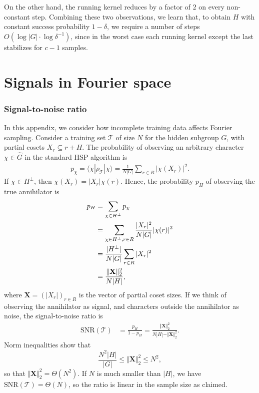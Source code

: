 \documentclass[aps, pre,reprint,nofootinbib,citeautoscript,floatfix]{revtex4-1}
\begin{document}
On the other hand, the running kernel reduces by a factor of $2$ on
every non-constant step. Combining these two observations, we learn
that, to obtain $H$ with constant success probability $1 - \delta$,
we require a number of steps $O(\log |G| \cdot \log
\delta^{-1})$, since in the worst case each running kernel except the last
stabilizes for $c - 1$ samples.

\section{Signals in Fourier space}
\label{sec:leak}

\subsubsection*{Signal-to-noise ratio}

In this appendix, we consider how incomplete training data affects Fourier sampling.
Consider a training set $\mathcal{T}$ of size $N$ for  the hidden subgroup $G$, with partial cosets $X_r \subseteq r + H$.
The probability of observing an arbitrary character $\chi \in \hat{G}$ in the standard HSP algorithm is
\begin{align}
    p_\chi = \langle\chi|\rho_\mathcal{T}|\chi\rangle
    = \frac{1}{N|G|}\sum_{r\in R}|\chi(X_r)|^2.
\end{align}
If $\chi \in H^\perp$, then $\chi(X_r)=|X_r|\chi(r)$. Hence, the probability $p_{H}$ of observing the true annihilator is
\begin{align}
    p_{H} & = \sum_{\chi\in H^\perp} p_\chi\notag\\
    & = \sum_{\chi\in H^\perp, r\in R}\frac{|X_r|^2}{N|G|} |\chi(r)|^2 \notag \\
    & = \frac{|H^\perp|}{N|G|}\sum_{r\in R}|X_r|^2\notag\\
    & = \frac{\Vert\mathbf{X} \Vert_2^2}{N|H|}, \label{eq:p_H}
\end{align}
where $\mathbf{X} = (|X_r|)_{r\in R}$ is the vector of partial coset sizes. If we think of observing the annihilator as signal, and characters outside the annihilator as noise, the signal-to-noise ratio is
\begin{align}
    \text{SNR}(\mathcal{T}) & = \frac{p_{H}}{1-p_{H}} = \frac{\Vert\mathbf{X} \Vert_2^2}{N|H| - \Vert\mathbf{X} \Vert_2^2}.
\end{align}
Norm inequalities show that
\[
\frac{N^2|H|}{|G|}\leq \Vert \mathbf{X}\Vert_2^2 \leq N^2,
\]
so that $\Vert \mathbf{X}\Vert_2^2 = \Theta(N^2)$. If $N$ is much smaller than $|H|$, we have $\text{SNR}(\mathcal{T}) = \Theta(N)$, so the ratio is linear in the sample size as claimed.
\end{document}
